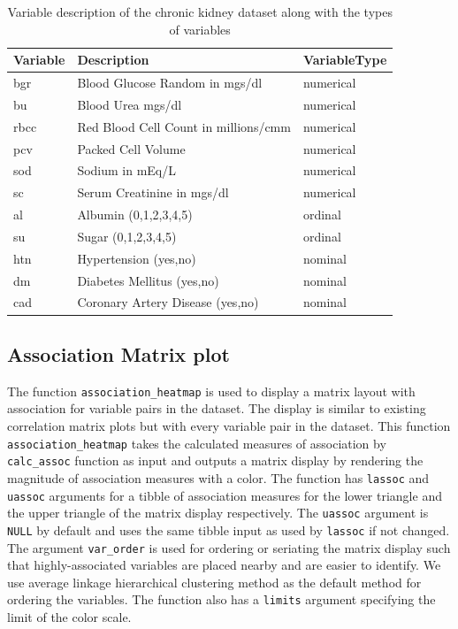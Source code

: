 \begin{Schunk}
\begin{table}

\caption{\label{tab:ckd}Variable description of the chronic kidney dataset along with the types of variables}
\centering
\begin{tabular}[t]{lll}
\toprule
Variable & Description & VariableType\\
\midrule
bgr & Blood Glucose Random in mgs/dl & numerical\\
bu & Blood Urea mgs/dl & numerical\\
rbcc & Red Blood Cell Count in millions/cmm & numerical\\
pcv & Packed  Cell Volume & numerical\\
sod & Sodium in mEq/L & numerical\\
\addlinespace
sc & Serum Creatinine in mgs/dl & numerical\\
al & Albumin (0,1,2,3,4,5) & ordinal\\
su & Sugar (0,1,2,3,4,5) & ordinal\\
htn & Hypertension (yes,no) & nominal\\
dm & Diabetes Mellitus (yes,no) & nominal\\
\addlinespace
cad & Coronary Artery Disease (yes,no) & nominal\\
\bottomrule
\end{tabular}
\end{table}

\end{Schunk}

\hypertarget{association-matrix-plot}{%
\subsection{Association Matrix plot}\label{association-matrix-plot}}

The function \texttt{association\_heatmap} is used to display a matrix
layout with association for variable pairs in the dataset. The display
is similar to existing correlation matrix plots but with every variable
pair in the dataset. This function \texttt{association\_heatmap} takes
the calculated measures of association by \texttt{calc\_assoc} function
as input and outputs a matrix display by rendering the magnitude of
association measures with a color. The function has \texttt{lassoc} and
\texttt{uassoc} arguments for a tibble of association measures for the
lower triangle and the upper triangle of the matrix display
respectively. The \texttt{uassoc} argument is \texttt{NULL} by default
and uses the same tibble input as used by \texttt{lassoc} if not
changed. The argument \texttt{var\_order} is used for ordering or
seriating the matrix display such that highly-associated variables are
placed nearby and are easier to identify. We use average linkage
hierarchical clustering method as the default method for ordering the
variables. The function also has a \texttt{limits} argument specifying
the limit of the color scale.

